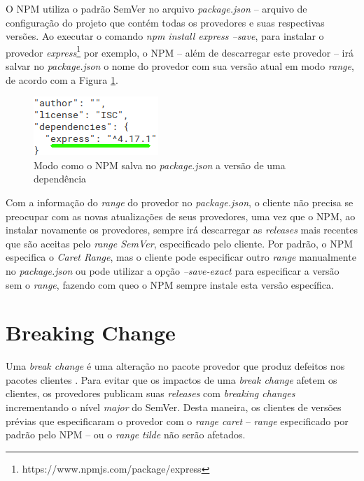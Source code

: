 O \gls{NPM} utiliza o padrão \gls{SemVer} no arquivo \textit{package.json} -- arquivo de configuração do projeto que contém todas os provedores e suas respectivas versões. Ao executar o comando \textit{npm install express --save}, para instalar o provedor \textit{express}\footnote{https://www.npmjs.com/package/express} por exemplo, o \gls{NPM} -- além de descarregar este provedor -- irá salvar no \textit{package.json} o nome do provedor com sua versão atual em modo \textit{range}, de acordo com a Figura \ref{fig:dep_express}.

\begin{figure}
    \centering
    \includegraphics{figuras/dependencies_express.png}
    \caption{Modo como o \gls{NPM} salva no \textit{package.json} a versão de uma dependência}
    \label{fig:dep_express}
\end{figure}{}

Com a informação do \textit{range} do provedor no \textit{package.json}, o cliente não precisa se preocupar com as novas atualizações de seus provedores, uma vez que o \gls{NPM}, ao instalar novamente os provedores, sempre irá descarregar as \textit{releases} mais recentes que são aceitas pelo \textit{range SemVer}, especificado pelo cliente. Por padrão, o \gls{NPM} especifica o \textit{Caret Range}, mas o cliente pode especificar outro \textit{range} manualmente no \textit{package.json} ou pode utilizar a opção \textit{--save-exact} para especificar a versão sem o \textit{range}, fazendo com queo o \gls{NPM} sempre instale esta versão específica.

\section{Breaking Change}
\label{ref-teo:breaking_change}
Uma \textit{break change} é uma alteração no pacote provedor que produz defeitos nos pacotes clientes \cite{teorical_reference:semver}. Para evitar que os impactos de uma \textit{break change} afetem os clientes, os provedores publicam suas \textit{releases} com \textit{breaking changes} incrementando o nível \textit{major} do \gls{SemVer}. Desta maneira, os clientes de versões prévias que especificaram o provedor com o \textit{range caret} -- \textit{range} especificado por padrão pelo \gls{NPM} -- ou o \textit{range tilde} não serão afetados.

